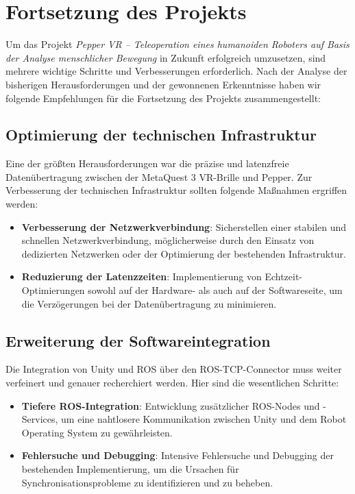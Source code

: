 \chapter{Fortsetzung des Projekts}
Um das Projekt \textit{Pepper VR – Teleoperation eines humanoiden Roboters auf Basis der Analyse menschlicher Bewegung} in Zukunft erfolgreich umzusetzen, sind mehrere wichtige Schritte und Verbesserungen erforderlich. Nach der Analyse der bisherigen Herausforderungen und der gewonnenen Erkenntnisse haben wir folgende Empfehlungen für die Fortsetzung des Projekts zusammengestellt:

\section{Optimierung der technischen Infrastruktur}
Eine der größten Herausforderungen war die präzise und latenzfreie Datenübertragung zwischen der MetaQuest 3 VR-Brille und Pepper. Zur Verbesserung der technischen Infrastruktur sollten folgende Maßnahmen ergriffen werden:
\begin{itemize}
    \item \textbf{Verbesserung der Netzwerkverbindung}: Sicherstellen einer stabilen und schnellen Netzwerkverbindung, möglicherweise durch den Einsatz von dedizierten Netzwerken oder der Optimierung der bestehenden Infrastruktur.
    \item \textbf{Reduzierung der Latenzzeiten}: Implementierung von Echtzeit-Optimierungen sowohl auf der Hardware- als auch auf der Softwareseite, um die Verzögerungen bei der Datenübertragung zu minimieren.
\end{itemize}

\section{Erweiterung der Softwareintegration}
Die Integration von Unity und ROS über den ROS-TCP-Connector muss weiter verfeinert und genauer recherchiert werden. Hier sind die wesentlichen Schritte:
\begin{itemize}
    \item \textbf{Tiefere ROS-Integration}: Entwicklung zusätzlicher ROS-Nodes und -Services, um eine nahtlosere Kommunikation zwischen Unity und dem Robot Operating System zu gewährleisten.
    \item \textbf{Fehlersuche und Debugging}: Intensive Fehlersuche und Debugging der bestehenden Implementierung, um die Ursachen für Synchronisationsprobleme zu identifizieren und zu beheben.
\end{itemize}

